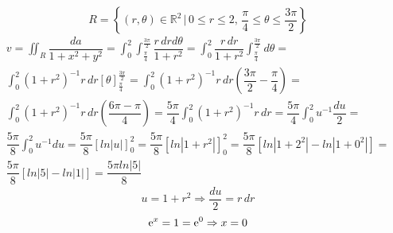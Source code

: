 \begin{enumerate}
	\begin{equation*}
		R = \left\{(r, \theta) \in \mathbb{R}^2 \,|\, 0 \leq r \leq 2,\, \dfrac{\pi}{4} \leq \theta \leq \dfrac{3\pi}{2} \right\}
	\end{equation*}
	\begin{gather*}
		v = \iint_R \dfrac{da}{1 + x^2 + y^2} = \int_0^2 \int_{\frac{\pi}{4}}^{\frac{3\pi}{2}} \dfrac{r\, drd\theta}{1 + r^2} = \int_0^2 \dfrac{r\, dr}{1 + r^2} \int_{\frac{\pi}{4}}^{\frac{3\pi}{2}} d\theta =\\ \int_0^2 \left(1 + r^2\right)^{-1} r\, dr \left[\theta\right]_{\frac{\pi}{4}}^{\frac{3\pi}{2}} = \int_0^2 \left(1 + r^2\right)^{-1} r\, dr \left(\dfrac{3\pi}{2} - \dfrac{\pi}{4}\right) =\\ \int_0^2 \left(1 + r^2\right)^{-1} r\, dr\left(\dfrac{6\pi - \pi}{4}\right) = \dfrac{5\pi}{4}\int_0^2 \left(1 + r^2\right)^{-1} r\, dr = \dfrac{5\pi}{4}\int_0^2 u^{-1} \dfrac{du}{2} =\\ \dfrac{5\pi}{8}\int_0^2 u^{-1} du = \dfrac{5\pi}{8}\left[ln |u|\right]_0^2 = \dfrac{5\pi}{8}\left[ln |1 + r^2|\right]_0^2 = \dfrac{5\pi}{8}\left[ln |1 + 2^2| - ln |1 + 0^2|\right] =\\ \dfrac{5\pi}{8}\left[ln |5| - ln |1|\right] = \dfrac{5\pi ln |5|}{8}
	\end{gather*}
	\begin{equation*}
		u = 1 + r^2 \Rightarrow \dfrac{du}{2} = r\,dr
	\end{equation*}
	\begin{equation*}
		\operatorname{e}^x = 1 = \operatorname{e}^0 \Rightarrow x = 0
	\end{equation*}
\end{enumerate}

